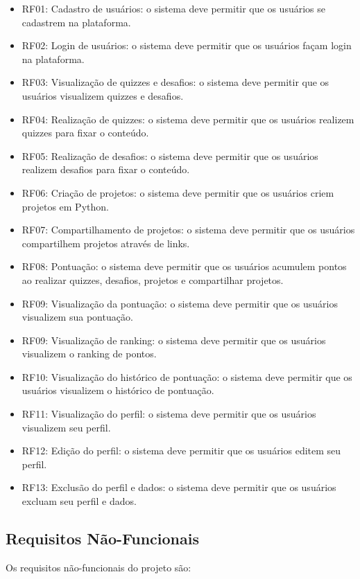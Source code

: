 \begin{itemize}
    \item RF01: Cadastro de usuários: o sistema deve permitir que os usuários se cadastrem na plataforma.
    \item RF02: Login de usuários: o sistema deve permitir que os usuários façam login na plataforma.
    \item RF03: Visualização de quizzes e desafios: o sistema deve permitir que os usuários visualizem quizzes e desafios.
    \item RF04: Realização de quizzes: o sistema deve permitir que os usuários realizem quizzes para fixar o conteúdo.
    \item RF05: Realização de desafios: o sistema deve permitir que os usuários realizem desafios para fixar o conteúdo.
    \item RF06: Criação de projetos: o sistema deve permitir que os usuários criem projetos em Python.
    \item RF07: Compartilhamento de projetos: o sistema deve permitir que os usuários compartilhem projetos através de links.
    \item RF08: Pontuação: o sistema deve permitir que os usuários acumulem pontos ao realizar quizzes, desafios, projetos e compartilhar projetos.
    \item RF09: Visualização da pontuação: o sistema deve permitir que os usuários visualizem sua pontuação.
    \item RF09: Visualização de ranking: o sistema deve permitir que os usuários visualizem o ranking de pontos.
    \item RF10: Visualização do histórico de pontuação: o sistema deve permitir que os usuários visualizem o histórico de pontuação.
    \item RF11: Visualização do perfil: o sistema deve permitir que os usuários visualizem seu perfil.
    \item RF12: Edição do perfil: o sistema deve permitir que os usuários editem seu perfil.
    \item RF13: Exclusão do perfil e dados: o sistema deve permitir que os usuários excluam seu perfil e dados.
\end{itemize}

\subsection{Requisitos Não-Funcionais}

Os requisitos não-funcionais do projeto são:

